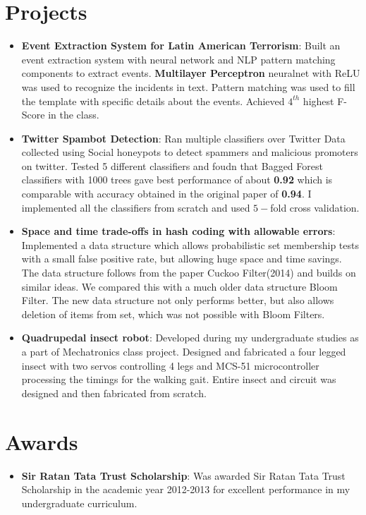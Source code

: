 \documentclass[letterpaper,11pt]{article}
\newcommand{\resumeItem}[2]{
  \item\small{
    \textbf{#1}{: #2 \vspace{-2pt}}
  }
}
\newcommand{\resumeSubItem}[2]{\resumeItem{#1}{#2}\vspace{-4pt}}
\newcommand{\resumeSubHeadingListStart}{\begin{itemize}[leftmargin=*]}
\newcommand{\resumeSubHeadingListEnd}{\end{itemize}}
\begin{document}
\section{Projects}
  \resumeSubHeadingListStart
    \resumeSubItem{Event Extraction System for Latin American Terrorism}
      {Built an event extraction system with neural network and NLP pattern matching components to extract events. \textbf{Multilayer Perceptron} neuralnet with ReLU was used to recognize the incidents in text. Pattern matching was used to fill the template with specific details about the events. Achieved $4^{th}$ highest F-Score in the class.}
    \resumeSubItem{Twitter Spambot Detection}
      {Ran multiple classifiers over Twitter Data collected using Social honeypots to detect spammers and malicious promoters on twitter. Tested 5 different classifiers and foudn that Bagged Forest classifiers with 1000 trees gave best performance of about \textbf{0.92} which is comparable with accuracy obtained in the original paper of \textbf{0.94}. I implemented all the classifiers from scratch and used $5-$fold cross validation.}
      \resumeSubItem{Space and time trade-offs in hash coding with allowable errors}
      {
		Implemented a data structure which allows probabilistic set membership tests with a small false positive rate, but allowing huge space and time savings. The data structure follows from the paper Cuckoo Filter(2014) and builds on similar ideas. We compared this with a much older data structure Bloom Filter. The new data structure not only performs better, but also allows deletion of items from set, which was not possible with Bloom Filters.
      }
      \resumeSubItem{Quadrupedal insect robot}
      {
      Developed during my undergraduate studies as a part of Mechatronics class project. Designed and fabricated a four legged insect with two servos controlling 4 legs and MCS-51 microcontroller processing the timings for the walking gait. Entire insect and circuit was designed and then fabricated from scratch.
      }
  \resumeSubHeadingListEnd

\section{Awards}
  \resumeSubHeadingListStart
    \resumeSubItem{Sir Ratan Tata Trust Scholarship}
      {Was awarded Sir Ratan Tata Trust Scholarship in the academic year 2012-2013 for excellent performance in my undergraduate curriculum.}
  \resumeSubHeadingListEnd
\end{document}
